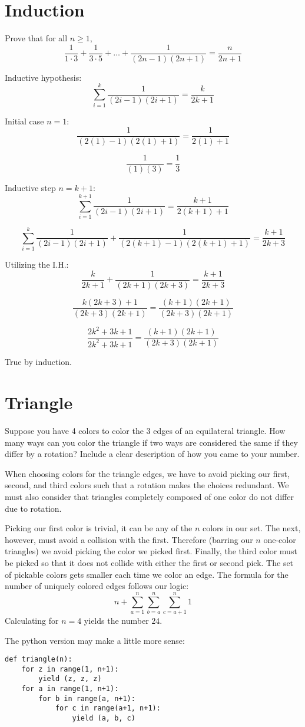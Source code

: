 \documentclass{article}
\begin{document}
\section{Induction}
Prove that for all $n \geq 1$,
\[
    \frac{1}{1 \cdot 3} +
    \frac{1}{3 \cdot 5} +
    \ldots +
    \frac{1}{(2n - 1)(2n + 1)} =
    \frac{n}{2n + 1}
\]

\noindent Inductive hypothesis:
\[
    \sum^k_{i = 1} \frac{1}{(2i - 1)(2i + 1)} =
    \frac{k}{2k + 1}
\]

\noindent Initial case $n = 1$:
\[
    \frac{1}{(2(1) - 1)(2(1) + 1)} =
    \frac{1}{2(1)+1}
\]

\[
    \frac{1}{(1)(3)} =
    \frac{1}{3}
\]

\medskip

\noindent Inductive step $n = k + 1$:
\[
    \sum^{k+1}_{i = 1} \frac{1}{(2i - 1)(2i + 1)} =
    \frac{k+1}{2(k + 1) + 1}
\]

\[
    \sum^{k}_{i = 1} \frac{1}{(2i - 1)(2i + 1)} +
    \frac{1}{(2(k + 1) - 1)(2(k + 1) + 1)} =
    \frac{k + 1}{2k + 3}
\]

\noindent Utilizing the I.H.:
\[
    \frac{k}{2k + 1} +
    \frac{1}{(2k + 1)(2k + 3)} =
    \frac{k + 1}{2k + 3}
\]

\[
    \frac{k(2k + 3) + 1}{(2k + 3)(2k + 1)} =
    \frac{(k + 1)(2k + 1)}{(2k + 3)(2k + 1)}
\]

\[
    \frac{2k^2 + 3k + 1}{2k^2 + 3k + 1} =
    \frac{(k + 1)(2k + 1)}{(2k + 3)(2k + 1)}
\]

True by induction.

\section{Triangle}
Suppose you have 4 colors to color the 3 edges of an equilateral triangle. How many ways can you color the triangle if two ways are considered the same if they differ by a rotation? Include a clear description of how you came to your number.

\bigskip

When choosing colors for the triangle edges, we have to avoid picking our first, second, and third colors such that a rotation makes the choices redundant. We must also consider that triangles completely composed of one color do not differ due to rotation.

Picking our first color is trivial, it can be any of the $n$ colors in our set. The next, however, must avoid a collision with the first. Therefore (barring our $n$ one-color triangles) we avoid picking the color we picked first. Finally, the third color must be picked so that it does not collide with either the first or second pick. The set of pickable colors gets smaller each time we color an edge. The formula for the number of uniquely colored edges follows our logic:
\[
    n + \sum^n_{a = 1} \sum^n_{b = a} \sum^n_{c = a + 1} 1
\]
Calculating for $n = 4$ yields the number $24$. 

\bigskip 
\noindent The python version may make a little more sense:
\begin{verbatim}
def triangle(n):
    for z in range(1, n+1):
        yield (z, z, z)
    for a in range(1, n+1):
        for b in range(a, n+1):
            for c in range(a+1, n+1):
                yield (a, b, c)
\end{verbatim}
\end{document}
